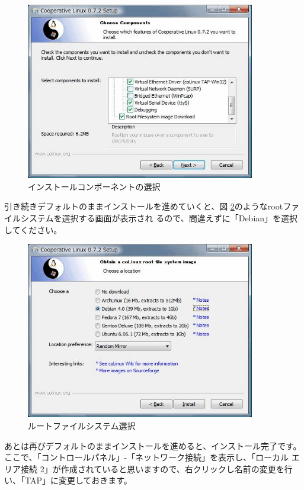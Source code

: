 \documentclass[mingoth,a4paper]{jsarticle}
\begin{document}
\begin{figure}[htbp]
 \begin{center}
  \includegraphics[width=100mm]{image200804/colinux_components.png}
 \end{center}
 \caption{インストールコンポーネントの選択}
 \label{fig:components}
\end{figure}

引き続きデフォルトのままインストールを進めていくと、図
\ref{fig:rootimage}のようなrootファイルシステムを選択する画面が表示され
るので、間違えずに「Debian」を選択してください。

\begin{figure}[htbp]
 \begin{center}
  \includegraphics[width=100mm]{image200804/colinux_rootimage.png}
 \end{center}
 \caption{ルートファイルシステム選択}
 \label{fig:rootimage}
\end{figure}

あとは再びデフォルトのままインストールを進めると、インストール完了です。
ここで、「コントロールパネル」-「ネットワーク接続」を表示し、「ローカル
エリア接続 2」が作成されていると思いますので、右クリックし名前の変更を行
い、「TAP」に変更しておきます。
\end{document}
